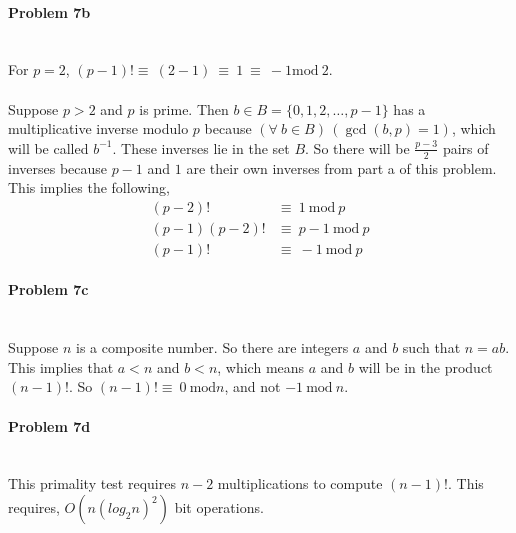 \documentclass[fleqn]{article}
\begin{document}
\paragraph{Problem 7b} ~\\
For $p=2$, $(p-1)! \equiv\ (2-1)\ \equiv\ 1\ \equiv\ -1 \textrm{mod}\ 2$.\\\\
Suppose $p > 2$ and $p$ is prime.  Then $b \in B = \{0, 1, 2, \ldots, p-1\}$ has a multiplicative inverse modulo $p$ because $(\forall\ b \in B)\,(\gcd{(b, p)} = 1)$, which will be called $b^{-1}$.  These inverses lie in the set $B$.  So there will be $\frac{p-3}{2}$ pairs of inverses because $p-1$ and $1$ are their own inverses from part a of this problem.  This implies the following,
\begin{align*}
	(p-2)! &\equiv\ 1\ \textrm{mod}\ p\\
	(p-1)(p-2)! &\equiv\ p-1\ \textrm{mod}\ p\\
	(p-1)! &\equiv\ -1\ \textrm{mod}\ p
\end{align*}

\paragraph{Problem 7c} ~\\
Suppose $n$ is a composite number.  So there are integers $a$ and $b$ such that $n=ab$.  This implies that $a < n$ and $b < n$, which means $a$ and $b$ will be in the product $(n-1)!$.  So $(n-1)! \equiv\ 0\ \textrm{mod} n$, and not $-1\ \textrm{mod}\ n$.

\paragraph{Problem 7d} ~\\
This primality test requires $n-2$ multiplications to compute $(n-1)!$.  This requires, $O(n(log_{2}n)^{2})$ bit operations.
 
\pagebreak
\end{document}

